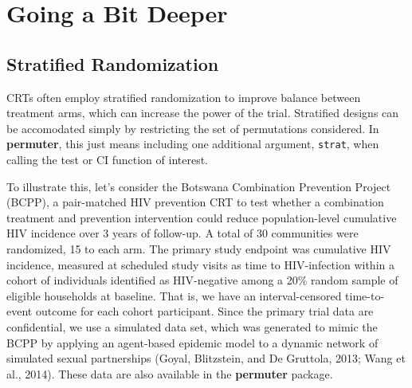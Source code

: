 \documentclass[12pt]{article}\usepackage[]{graphicx}\usepackage[]{color}
\begin{document}
\section{Going a Bit Deeper}

\subsection{Stratified Randomization}
CRTs often employ stratified randomization to improve balance between treatment arms, which can increase the power of the trial. Stratified designs can be accomodated simply by restricting the set of permutations considered. In \textbf{permuter}, this just means including one additional argument, \texttt{strat}, when calling the test or CI function of interest.

To illustrate this, let's consider the Botswana Combination Prevention Project (BCPP), a pair-matched HIV prevention CRT to test whether a combination treatment and prevention intervention could reduce population-level cumulative HIV incidence over 3 years of follow-up. A total of 30 communities were randomized, 15 to each arm. The primary study endpoint was cumulative HIV incidence, measured at scheduled study visits as time to HIV-infection within a cohort of individuals identified as HIV-negative among a 20\% random sample of eligible households at baseline. That is, we have an interval-censored time-to-event outcome for each cohort participant. Since the primary trial data are confidential, we use a simulated data set, which was generated to mimic the BCPP by applying an agent-based epidemic model to a dynamic network of simulated sexual partnerships (Goyal, Blitzstein, and De Gruttola, 2013; Wang et al., 2014). These data are also available in the \textbf{permuter} package.
\end{document}
